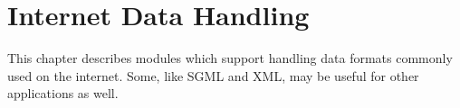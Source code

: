 \chapter{Internet Data Handling \label{netdata}}

This chapter describes modules which support handling data formats
commonly used on the internet.  Some, like SGML and XML, may be useful 
for other applications as well.

\localmoduletable
